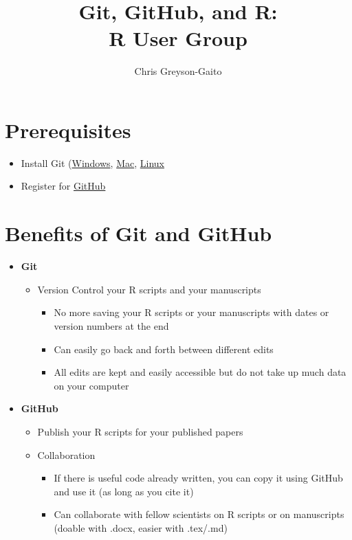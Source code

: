\documentclass[12pt,letterpaper]{article} %
\begin{document}
\title{Git, GitHub, and R:\\ R User Group}
\author{Chris Greyson-Gaito}
\date{}
\maketitle
\section*{Prerequisites}
\begin{itemize}
\item Install Git (\href{https://git-scm.com/download/win}{Windows}, \href{https://git-scm.com/download/mac}{Mac}, \href{https://git-scm.com/download/linux}{Linux}
\item Register for \href{https://github.com/join?source=header-home}{GitHub}
\end{itemize}
\section*{Benefits of Git and GitHub}
\begin{itemize}
\item \textbf{Git}
\begin{itemize}
\item Version Control your R scripts and your manuscripts
\begin{itemize}
\item No more saving your R scripts or your manuscripts with dates or version numbers at the end
\item Can easily go back and forth between different edits
\item All edits are kept and easily accessible but do not take up much data on your computer
\end{itemize}
\end{itemize}
\item \textbf{GitHub}
\begin{itemize}
\item Publish your R scripts for your published papers
\item Collaboration
\begin{itemize}
\item If there is useful code already written, you can copy it using GitHub and use it (as long as you cite it)
\item Can collaborate with fellow scientists on R scripts or on manuscripts (doable with .docx, easier with .tex/.md)
\end{itemize}
\end{itemize}
\end{itemize}
\end{document}
